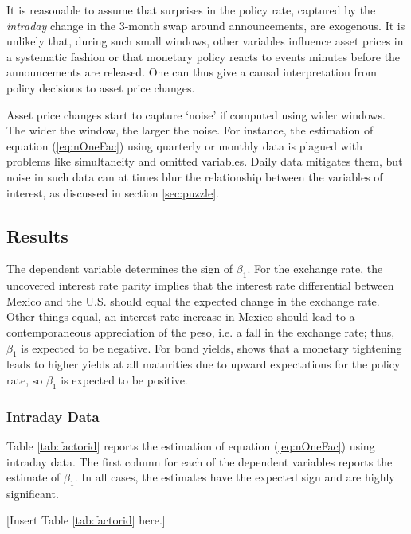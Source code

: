 \documentclass[a4paper,12pt]{article} 		%
\newcommand{\sectitlespace}{\vspace{0.1in}}
\providecommand{\paramB}{\beta}
\providecommand{\slopetrgt}{\paramB_{1}}
\begin{document}
It is reasonable to assume that surprises in the policy rate, captured by the \textit{intraday} change in the 3-month swap around announcements, are exogenous. It is unlikely that, during such small windows, other variables influence asset prices in a systematic fashion or that monetary policy reacts to events minutes before the announcements are released. One can thus give a causal interpretation from policy decisions to asset price changes. 

Asset price changes start to capture `noise' if computed using wider windows. The wider the window, the larger the noise. For instance, the estimation of equation (\ref{eq:nOneFac}) using quarterly or monthly data is plagued with problems like simultaneity and omitted variables. Daily data mitigates them, but noise in such data can at times blur the relationship between the variables of interest, as discussed in section \ref{sec:puzzle}. 

\sectitlespace
\subsection{Results}
\sectitlespace
The dependent variable determines the sign of \(\slopetrgt\). For the exchange rate, the uncovered interest rate parity implies that the interest rate differential between Mexico and the U.S. should equal the expected change in the exchange rate. Other things equal, an interest rate increase in Mexico should lead to a contemporaneous appreciation of the peso, i.e. a fall in the exchange rate; thus, \(\slopetrgt\) is expected to be negative. For bond yields, \textcite{Kuttner:2001} shows that a monetary tightening leads to higher yields at all maturities due to upward expectations for the policy rate, so \(\slopetrgt\) is expected to be positive. 

\sectitlespace
\subsubsection{Intraday Data}
\sectitlespace
Table \ref{tab:factorid} reports the estimation of equation (\ref{eq:nOneFac}) using intraday data. The first column for each of the dependent variables reports the estimate of \(\slopetrgt\). In all cases, the estimates have the expected sign and are highly significant.

\begin{center}
	[Insert Table \ref{tab:factorid} here.]
\end{center}
\end{document}
